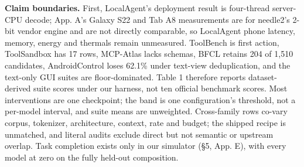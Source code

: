\documentclass{article}
\begin{document}
\textbf{Claim boundaries.} First, LocalAgent's deployment result is four-thread server-CPU decode;
App. A's Galaxy S22 and Tab A8 measurements are for needle2's 2-bit vendor engine and are
not directly comparable, so LocalAgent phone latency, memory, energy and thermals remain unmeasured.
ToolBench is first action, ToolSandbox has 17 rows, MCP-Atlas lacks schemas, BFCL retains 204 of
1,510 candidates, AndroidControl loses 62.1\% under text-view deduplication, and the text-only GUI
suites are floor-dominated. Table 1 therefore reports dataset-derived suite scores under our
harness, not ten official benchmark scores. Most interventions are one
checkpoint; the band is one configuration's threshold, not a per-model interval, and suite means
are unweighted. Cross-family rows co-vary corpus, tokenizer, architecture, context, rate and budget;
the shipped recipe is unmatched, and literal audits exclude direct but not semantic or upstream
overlap. Task completion exists only in our simulator (\S5, App. E), with every model at zero on the
fully held-out composition.
\end{document}
